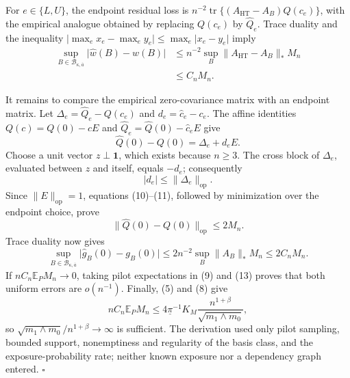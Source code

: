 For \(e\in\{L,U\}\), the endpoint residual loss is \(n^{-2}\operatorname{tr}\{(A_{\mathrm{HT}}-A_B)Q(c_e)\}\), with the empirical analogue obtained by replacing \(Q(c_e)\) by \(\widehat Q_e\).  Trace duality and the inequality \(\lvert\max_e x_e-\max_e y_e\rvert\le\max_e\lvert x_e-y_e\rvert\) imply
\[
\begin{aligned}
\sup_{B\in\mathcal B_{\kappa,\overline a}}
\lvert\widehat w(B)-w(B)\rvert
&\le n^{-2}\sup_B
\lVert A_{\mathrm{HT}}-A_B\rVert_*M_n\\
&\le C_nM_n.
\end{aligned}
\tag{9}
\]

It remains to compare the empirical zero-covariance matrix with an endpoint matrix.  Let \(\Delta_e=\widehat Q_e-Q(c_e)\) and \(d_e=\widehat c_e-c_e\).  The affine identities \(Q(c)=Q(0)-cE\) and \(\widehat Q_e=\widehat Q(0)-\widehat c_eE\) give
\[
\widehat Q(0)-Q(0)=\Delta_e+d_eE.
\tag{10}
\]
Choose a unit vector \(z\perp\mathbf1\), which exists because \(n\ge3\).  The cross block of \(\Delta_e\), evaluated between \(z\) and itself, equals \(-d_e\); consequently
\[
\lvert d_e\rvert\le\lVert\Delta_e\rVert_{\mathrm{op}}.
\tag{11}
\]
Since \(\lVert E\rVert_{\mathrm{op}}=1\), equations (10)--(11), followed by minimization over the endpoint choice, prove
\[
\lVert\widehat Q(0)-Q(0)\rVert_{\mathrm{op}}\le2M_n.
\tag{12}
\]
Trace duality now gives
\[
\sup_{B\in\mathcal B_{\kappa,\overline a}}
\lvert\widehat g_B(0)-g_B(0)\rvert
\le2n^{-2}\sup_B\lVert A_B\rVert_*M_n
\le2C_nM_n.
\tag{13}
\]
If \(nC_n\mathbb E_PM_n\to0\), taking pilot expectations in (9) and (13) proves that both uniform errors are \(o(n^{-1})\).  Finally, (5) and (8) give
\[
nC_n\mathbb E_PM_n
\le4\underline\pi^{-1}K_M
\frac{n^{1+\beta}}{\sqrt{m_1\wedge m_0}},
\tag{14}
\]
so \(\sqrt{m_1\wedge m_0}/n^{1+\beta}\to\infty\) is sufficient.  The derivation used only pilot sampling, bounded support, nonemptiness and regularity of the basis class, and the exposure-probability rate; neither known exposure nor a dependency graph entered. \(\square\)